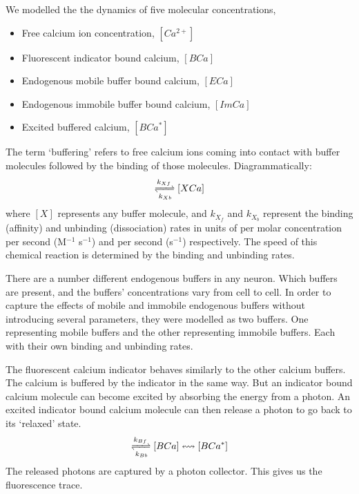 We modelled the the dynamics of five molecular concentrations,
\begin{itemize}
    \item Free calcium ion concentration, $[Ca^{2+}]$
    \item Fluorescent indicator bound calcium, $[BCa]$
    \item Endogenous mobile buffer bound calcium, $[ECa]$
    \item Endogenous immobile buffer bound calcium, $[ImCa]$
    \item Excited buffered calcium, $[BCa^{\ast}]$
\end{itemize}
The term ‘buffering’ refers to free calcium ions coming into contact with buffer molecules followed by the binding of those molecules. Diagrammatically:
\begin{align*}
    [X][Ca^{2+}] \xrightleftharpoons[k_{Xb}]{k_{Xf}} [XCa]
\end{align*}
where $[X]$ represents any buffer molecule, and $k_{X_f}$ and $k_{X_b}$ represent the binding (affinity) and unbinding (dissociation) rates in units of per molar concentration per second (M$^{-1}$ s$^{-1}$) and per second (s$^{-1}$) respectively. The speed of this chemical reaction is determined by the binding and unbinding rates.

There are a number different endogenous buffers in any neuron. Which buffers are present, and the buffers’ concentrations vary from cell to cell. In order to capture the effects of mobile and immobile endogenous buffers without introducing several parameters, they were modelled as two buffers. One representing mobile buffers and the other representing immobile buffers. Each with their own binding and unbinding rates.

The fluorescent calcium indicator behaves similarly to the other calcium buffers. The calcium is buffered by the indicator in the same way. But an indicator bound calcium molecule can become excited by absorbing the energy from a photon. An excited indicator bound calcium molecule can then release a photon to go back to its ‘relaxed’ state.
\begin{align*}
    [B][Ca^{2+}] \xrightleftharpoons[k_{Bb}]{k_{Bf}} [BCa] \leftrightsquigarrow [BCa^{\ast}]
\end{align*}
The released photons are captured by a photon collector. This gives us the fluorescence trace.

